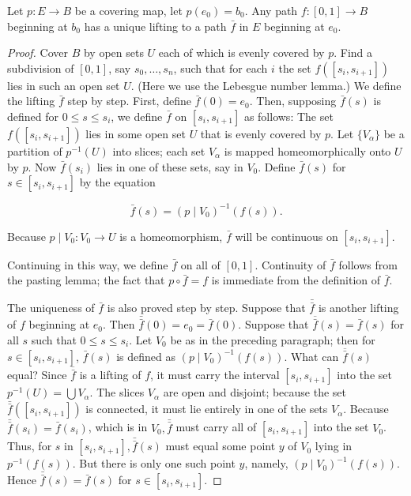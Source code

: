 \begin{lemma}
\label{lem:\thetheorem}
Let \(p : E \rightarrow B\) be a covering map, let \(p( e_{0}) = b_{0}\). Any path \(f : [ {0,1}] \rightarrow B\) beginning at \(b_{0}\) has a unique lifting to a path \(\bar{f}\) in \(E\) beginning at \(e_{0}\).
\end{lemma}

\begin{proof}
Cover \(B\) by open sets \(U\) each of which is evenly covered by \(p\). Find a subdivision of \([ {0,1}]\), say \(s_{0},\ldots ,s_{n}\), such that for each \(i\) the set \(f( [ {s_{i},s_{i + 1}}] )\) lies in such an open set \(U\). (Here we use the Lebesgue number lemma.) We define the lifting \(\bar{f}\) step by step.
First, define \(\bar{f}( 0) = e_{0}\). Then, supposing \(\bar{f}( s)\) is defined for \(0 \leq s \leq {s}_{i}\), we define \(\bar{f}\) on \([ {s_{i},s_{i + 1}}]\) as follows: The set \(f( [ {s_{i},s_{i + 1}}] )\) lies in some open set \(U\) that is evenly covered by \(p\). Let \(\{ V_{\alpha }\}\) be a partition of \(p^{-1}( U)\) into slices; each set \(V_{\alpha }\) is mapped homeomorphically onto \(U\) by \(p\). Now \(\bar{f}( s_{i})\) lies in one of these sets, say in \(V_{0}\). Define \(\bar{f}( s)\) for \(s \in [ {s_{i},s_{i + 1}}]\) by the equation

\[
\bar{f}( s) = {( p \mid {V}_{0}) }^{-1}( {f( s) }).
\]

Because \(p \mid {V}_{0} : V_{0} \rightarrow U\) is a homeomorphism, \(\bar{f}\) will be continuous on \([ {s_{i},s_{i + 1}}]\).

Continuing in this way, we define \(\bar{f}\) on all of \([ {0,1}]\). Continuity of \(\bar{f}\) follows from the pasting lemma; the fact that \(p \circ \bar{f} = f\) is immediate from the definition of \(\bar{f}\).

The uniqueness of \(\bar{f}\) is also proved step by step. Suppose that \(\bar{\bar{f}}\) is another lifting of \(f\) beginning at \(e_{0}\). Then \(\bar{\bar{f}}( 0) = e_{0} = \bar{f}( 0)\). Suppose that \(\overline{\bar{f}}( s) = \bar{f}( s)\) for all \(s\) such that \(0 \leq s \leq {s}_{i}\). Let \(V_{0}\) be as in the preceding paragraph; then for \(s \in [ {s_{i},s_{i + 1}}]\), \(\bar{f}( s)\) is defined as \({( p \mid {V}_{0}) }^{-1}( {f( s) })\). What can \(\overline{\bar{f}}( s)\) equal? Since \(\overline{\bar{f}}\) is a lifting of \(f\), it must carry the interval \([ {s_{i},s_{i + 1}}]\) into the set \(p^{-1}( U) = \bigcup {V}_{\alpha }\). The slices \(V_{\alpha }\) are open and disjoint; because the set \(\bar{\bar{f}}( [ {s_{i},s_{i + 1}}] )\) is connected, it must lie entirely in one of the sets \(V_{\alpha }\). Because \(\bar{\bar{f}}( s_{i}) = \bar{f}( s_{i})\), which is in \(V_{0},\bar{\bar{f}}\) must carry all of \([ {s_{i},s_{i + 1}}]\) into the set \(V_{0}\). Thus, for \(s\) in \([ {s_{i},s_{i + 1}}] ,\bar{\bar{f}}( s)\) must equal some point \(y\) of \(V_{0}\) lying in \(p^{-1}( {f( s) })\). But there is only one such point \(y\), namely, \({( p \mid {V}_{0}) }^{-1}( {f( s) })\). Hence \(\bar{\bar{f}}( s) = \bar{f}( s)\) for \(s \in [ {s_{i},s_{i + 1}}]\).
\end{proof}
